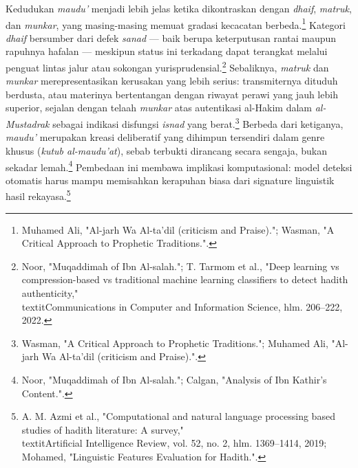 Kedudukan \textit{maudu'} menjadi lebih jelas ketika dikontraskan dengan \textit{dhaif}, \textit{matruk}, dan \textit{munkar}, yang masing-masing memuat gradasi kecacatan berbeda.\footnote{Muhamed Ali, "Al-jarh Wa Al-ta'dil (criticism and Praise)."; Wasman, "A Critical Approach to Prophetic Traditions.".} Kategori \textit{dhaif} bersumber dari defek \textit{sanad} --- baik berupa keterputusan rantai maupun rapuhnya hafalan --- meskipun status ini terkadang dapat terangkat melalui penguat lintas jalur atau sokongan yurisprudensial.\footnote{Noor, "Muqaddimah of Ibn Al-salah."; T. Tarmom et al., "Deep learning vs compression-based vs traditional machine learning classifiers to detect hadith authenticity," \\textit{Communications in Computer and Information Science}, hlm. 206--222, 2022.} Sebaliknya, \textit{matruk} dan \textit{munkar} merepresentasikan kerusakan yang lebih serius: transmiternya dituduh berdusta, atau materinya bertentangan dengan riwayat perawi yang jauh lebih superior, sejalan dengan telaah \textit{munkar} atas autentikasi al-Hakim dalam \textit{al-Mustadrak} sebagai indikasi disfungsi \textit{isnad} yang berat.\footnote{Wasman, "A Critical Approach to Prophetic Traditions."; Muhamed Ali, "Al-jarh Wa Al-ta'dil (criticism and Praise).".} Berbeda dari ketiganya, \textit{maudu'} merupakan kreasi deliberatif yang dihimpun tersendiri dalam genre khusus (\textit{kutub al-maudu'at}), sebab terbukti dirancang secara sengaja, bukan sekadar lemah.\footnote{Noor, "Muqaddimah of Ibn Al-salah."; Calgan, "Analysis of Ibn Kathir's Content.".} Pembedaan ini membawa implikasi komputasional: model deteksi otomatis harus mampu memisahkan kerapuhan biasa dari signature linguistik hasil rekayasa.\footnote{A. M. Azmi et al., "Computational and natural language processing based studies of hadith literature: A survey," \\textit{Artificial Intelligence Review}, vol. 52, no. 2, hlm. 1369--1414, 2019; Mohamed, "Linguistic Features Evaluation for Hadith.".}

